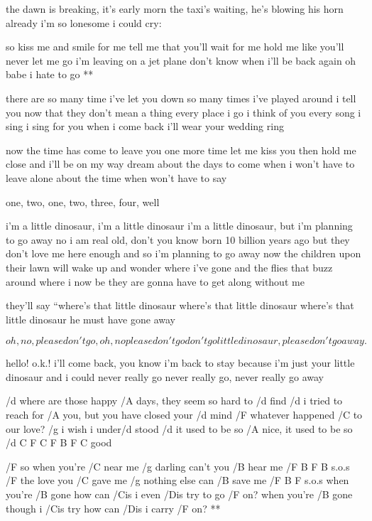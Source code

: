 the dawn is breaking, it's early morn
the taxi's waiting, he's blowing his horn
already i'm so lonesome i could cry:

\R  so kiss me and smile for me
    tell me that you'll wait for me
    hold me like you'll never let me go
    i'm leaving on a jet plane
    don't know when i'll be back again
    oh babe i hate to go **

there are so many time i've let you down
so many times i've played around
i tell you now that they don't mean a thing
every place i go i think of you
every song i sing i sing for you
when i come back i'll wear your wedding ring \s

now the time has come to leave you
one more time let me kiss you
then hold me close and i'll be on my way
dream about the days to come
when i won't have to leave alone
about the time when  won't have to say




one, two, one, two, three, four, well

i'm a little dinosaur, i'm a little dinosaur
i'm a little dinosaur, but i'm planning to go away
no i am real old, don't you know
born 10 billion years ago
but they don't love me here enough and so
i'm planning to go away
now the children upon their lawn
will wake up and wonder where i've gone
and the flies that buzz around where i now be
they are gonna have to get along without me \s

they'll say ``where's that little dinosaur
where's that little dinosaur
where's that little dinosaur
he must have gone away \s

\[ oh, no, please don't go, oh, no please don't go
don't go little dinosaur, please don't go away. \] \s

hello! o.k.! i'll come back, you know i'm back to stay
because i'm just your little dinosaur
and i could never really go
never really go, never really go away




/d where are those happy /A days, they seem so hard to /d find
/d i tried to reach for /A you, but you have closed your /d mind
/F whatever happened /C to our love? /g i wish i under/d stood
/d it used to be so /A nice, it used to be so /{d C F C F B F C} good

\R  /F so when you're /C near me
    /g darling can't you /B hear me /{F B F B} s.o.s
    /F the love you /C gave me
    /g nothing else can /B save me /{F B F} s.o.s
    when you're /B gone
    how can /Cis i even /Dis try to go /F on?
    when you're /B gone
    though i /Cis try how can /Dis i carry /F on? **


